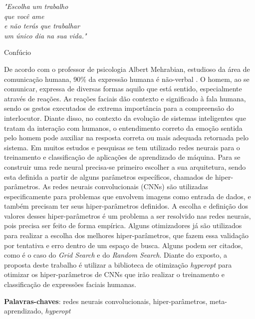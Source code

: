 \documentclass[
12pt,       %
openright,      %
oneside,      %
a4paper,      %
english,      %
french,       %
spanish,      %
brazil        %
]{abntex2}
\begin{document}
\newpage
\begin{epigrafe}
    \vspace*{\fill}
  \begin{flushright}
    \textit{"Escolha um trabalho
    \\que você ame
    \\e não terás que trabalhar
    \\um único dia na sua vida."}

Confúcio
  \end{flushright}
\end{epigrafe}



\setlength{\absparsep}{18pt} %
\begin{resumo}

De acordo com o professor de psicologia Albert Mehrabian, estudioso da área de comunicação humana, 90\% da expressão humana é não-verbal \cite{mehrabian1971silent}.  O homem, ao se comunicar, expressa de diversas formas aquilo que está sentido, especialmente através de reações. As reações faciais dão contexto e significado à fala humana, sendo os gestos executados de extrema importância para a compreensão do interlocutor. Diante disso, no contexto da evolução de sistemas inteligentes que tratam da interação com humanos, o entendimento correto da emoção sentida pelo homem pode auxiliar na resposta correta ou mais adequada retornada pelo sistema. Em muitos estudos e pesquisas se tem utilizado redes neurais para o treinamento e classificação de aplicações de aprendizado de máquina. Para se construir uma rede neural precisa-se primeiro escolher a sua arquitetura, sendo esta definida a partir de alguns parâmetros específicos, chamados de hiper-parâmetros. As redes neurais convolucionais (CNNs) são utilizadas especificamente para problemas que envolvem imagens como entrada de dados, e também precisam ter seus hiper-parâmetros definidos. A escolha e definição dos valores desses hiper-parâmetros é um problema a ser resolvido nas redes neurais, pois precisa ser feito de forma empírica. Alguns otimizadores já são utilizados para realizar a escolha dos melhores hiper-parâmetros, que fazem essa validação por tentativa e erro dentro de um espaço de busca. Alguns podem ser citados, como é o caso do \textit{Grid Search} e do \textit{Random Search}. Diante do exposto, a proposta deste trabalho é utilizar a biblioteca de otimização \textit{hyperopt} para otimizar os hiper-parâmetros de CNNs que irão realizar o treinamento e classificação de expressões faciais humanas.

\noindent
\textbf{Palavras-chaves}: redes neurais convolucionais, hiper-parâmetros, meta-aprendizado, \textit{hyperopt}

\end{resumo}
\end{document}

